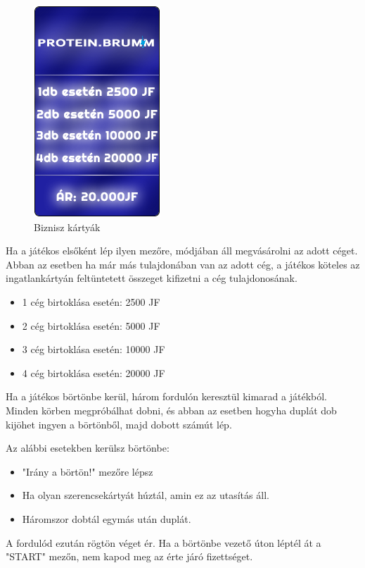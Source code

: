 \begin{figure}[h!]
\includegraphics[scale=0.4]{images/b4.png}
\caption{Biznisz kártyák}
\label{fig:ff}
\end{figure}

Ha a játékos elsőként lép ilyen mezőre, módjában áll megvásárolni az adott céget. Abban az esetben ha már más tulajdonában van az adott cég, a játékos köteles az ingatlankártyán feltüntetett összeget kifizetni a cég tulajdonosának.

\begin{itemize}
\item 1 cég birtoklása esetén: 2500 JF
\item 2 cég birtoklása esetén: 5000 JF
\item 3 cég birtoklása esetén: 10000 JF
\item 4 cég birtoklása esetén: 20000 JF
\end{itemize}


Ha a játékos börtönbe kerül, három fordulón keresztül kimarad a játékból. Minden körben megpróbálhat dobni, és abban az esetben hogyha duplát dob kijöhet ingyen a börtönből, majd dobott számút lép.

Az alábbi esetekben kerülsz börtönbe:

\begin{itemize}
\item "Irány a börtön!" mezőre lépsz
\item Ha olyan szerencsekártyát húztál, amin ez az utasítás áll.
\item Háromszor dobtál egymás után duplát.
\end{itemize}

A fordulód ezután rögtön véget ér. Ha a börtönbe vezető úton léptél át a "START" mezőn, nem kapod meg az érte járó fizettséget.

